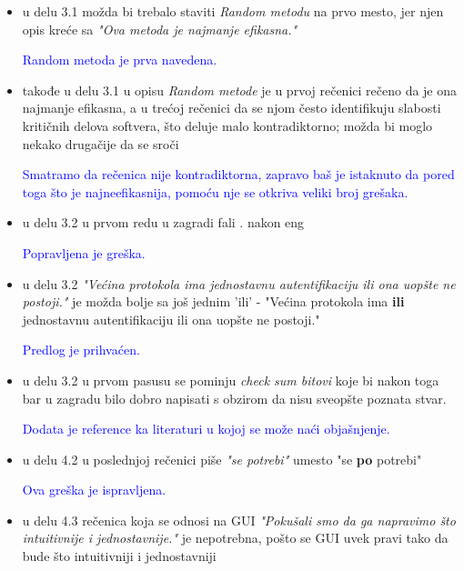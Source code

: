 \documentclass[a4paper]{report}
\newcommand{\odgovor}[1]{\textcolor{blue}{#1}}
\begin{document}
\begin{itemize}

\item u delu 3.1 možda bi trebalo staviti \textit{Random metodu} na prvo mesto, jer njen opis kreće sa \textit{"Ova metoda je najmanje efikasna."} 

\odgovor{
Random metoda je prva navedena.
}\\

\item takođe u delu 3.1 u opisu \textit{Random metode} je u prvoj rečenici rečeno da je ona najmanje efikasna, a u trećoj rečenici da se njom često identifikuju slabosti kritičnih delova softvera, što deluje malo kontradiktorno; možda bi moglo nekako drugačije da se sroči 

\odgovor{
Smatramo da rečenica nije kontradiktorna, zapravo baš je istaknuto da pored toga što je najneefikasnija, pomoću nje se otkriva veliki broj grešaka.
}\\


\item u delu 3.2 u prvom redu u zagradi fali . nakon eng 

\odgovor{
Popravljena je greška.
}\\

\item u delu 3.2 \textit{"Većina protokola ima jednostavnu autentifikaciju ili ona uopšte ne postoji."} je možda bolje sa još jednim 'ili' - "Većina protokola ima \textbf{ili} jednostavnu autentifikaciju ili ona uopšte ne postoji." 

\odgovor{
Predlog je prihvaćen.
}\\

\item u delu 3.2 u prvom pasusu se pominju \textit{check sum bitovi} koje bi nakon toga bar u zagradu bilo dobro napisati s obzirom da nisu sveopšte poznata stvar.

\odgovor{
Dodata je reference ka literaturi u kojoj se može naći objašnjenje.
}\\

\item u delu 4.2 u poslednjoj rečenici piše \textit{"se potrebi"} umesto "se \textbf{po} potrebi" 

\odgovor{
Ova greška je ispravljena.
}\\

\item u delu 4.3 rečenica koja se odnosi na GUI \textit{"Pokušali smo da ga napravimo što intuitivnije i jednostavnije."} je nepotrebna, pošto se GUI uvek pravi tako da bude što intuitivniji i jednostavniji 


\end{itemize}
\end{document}
